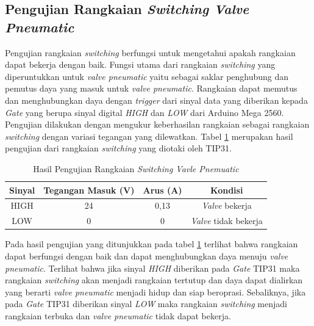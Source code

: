 \subsection{Pengujian Rangkaian \textit{Switching Valve Pneumatic}}
Pengujian rangkaian \textit{switching} berfungsi untuk mengetahui apakah rangkaian dapat bekerja dengan baik. Fungsi utama dari rangkaian \textit{switching} yang diperuntukkan untuk \textit{valve pneumatic} yaitu sebagai saklar penghubung dan pemutus daya yang masuk untuk \textit{valve pneumatic}. Rangkaian dapat memutus dan menghubungkan daya dengan \textit{trigger} dari sinyal data yang diberikan kepada \textit{Gate} yang berupa sinyal digital \textit{HIGH} dan \textit{LOW} dari Arduino Mega 2560. Pengujian dilakukan dengan mengukur keberhasilan rangkaian sebagai rangkaian \textit{switching} dengan variasi tegangan yang dilewatkan. Tabel \ref{tbl.rangkaiantip} merupakan hasil pengujian dari rangkaian \textit{switching} yang diotaki oleh TIP31.
\begin{table}[H]
	\centering
	\caption{Hasil Pengujian Rangkaian \textit{Switching Vavle Pnemuatic}}
	\label{tbl.rangkaiantip}
	\begin{tabular}{|c|c|c|c|}
		\hline
		\rowcolor[HTML]{9B9B9B} 
		Sinyal & Tegangan Masuk (V) & Arus (A) & Kondisi             \\ \hline
		HIGH   & 24                 & 0,13     & \textit{Valve} bekerja       \\ \hline
		LOW    & 0                  & 0      & \textit{Valve} tidak bekerja \\ \hline
	\end{tabular}
	
\end{table} 

Pada hasil pengujian yang ditunjukkan pada tabel \ref{tbl.rangkaiantip} terlihat bahwa rangkaian dapat berfungsi dengan baik dan dapat menghubungkan daya menuju \textit{valve pneumatic}. Terlihat bahwa jika sinyal \textit{HIGH} diberikan pada \textit{Gate} TIP31 maka rangkaian \textit{switching} akan menjadi rangkaian tertutup dan daya dapat dialirkan yang berarti \textit{valve pneumatic} menjadi hidup dan siap beroprasi. Sebaliknya, jika pada \textit{Gate} TIP31 diberikan sinyal \textit{LOW} maka rangkaian \textit{switching} menjadi rangkaian terbuka dan \textit{valve pneumatic} tidak dapat bekerja.
	


